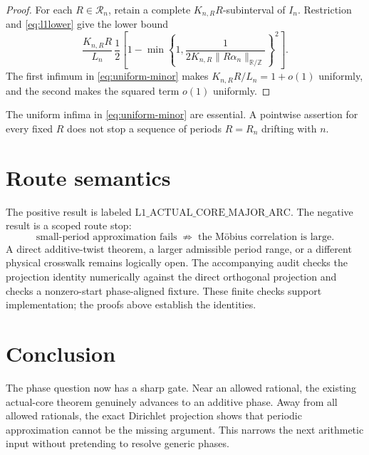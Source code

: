 \documentclass[11pt]{article}
\theoremstyle{definition}
\newcommand{\norm}[1]{\lVert#1\rVert}
\begin{document}
\begin{proof}
For each \(R\in\mathcal R_n\), retain a complete
\(K_{n,R}R\)-subinterval of \(I_n\).  Restriction and
\eqref{eq:l1lower} give the lower bound
\[
 \frac{K_{n,R}R}{L_n}\,
 \frac12\left[
 1-
 \min\left\{1,
 \frac{1}{
  2K_{n,R}\norm{R\alpha_n}_{\mathbb R/\mathbb Z}}
 \right\}^{\!2}
 \right].
\]
The first infimum in \eqref{eq:uniform-minor} makes
\(K_{n,R}R/L_n=1+o(1)\) uniformly, and the second makes the squared
term \(o(1)\) uniformly.
\end{proof}

The uniform infima in \eqref{eq:uniform-minor} are essential.  A
pointwise assertion for every fixed \(R\) does not stop a sequence of
periods \(R=R_n\) drifting with \(n\).

\section{Route semantics}

The positive result is labeled
\(\mathrm{L1\_ACTUAL\_CORE\_MAJOR\_ARC}\).  The negative result is a
scoped route stop:
\[
 \text{small-period approximation fails}
 \;\not\Rightarrow\;
 \text{the M\"obius correlation is large}.
\]
A direct additive-twist theorem, a larger admissible period range, or
a different physical crosswalk remains logically open.  The
accompanying audit checks the projection identity numerically against
the direct orthogonal projection and checks a nonzero-start
phase-aligned fixture.  These finite checks support implementation;
the proofs above establish the identities.

\section{Conclusion}

The phase question now has a sharp gate.  Near an allowed rational,
the existing actual-core theorem genuinely advances to an additive
phase.  Away from all allowed rationals, the exact Dirichlet
projection shows that periodic approximation cannot be the missing
argument.  This narrows the next arithmetic input without pretending
to resolve generic phases.



\end{document}
